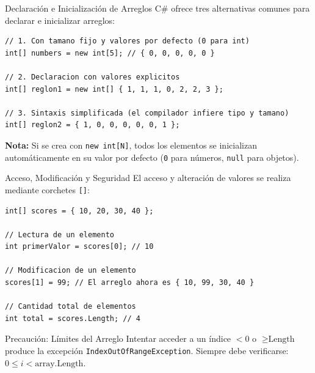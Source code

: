 \documentclass{beamer}
\begin{document}
\begin{frame}[fragile]{Declaraci\'on e Inicializaci\'on de Arreglos}
\lstset{style=CSharpStyle}
C\# ofrece tres alternativas comunes para declarar e inicializar arreglos:

\begin{lstlisting}
// 1. Con tamano fijo y valores por defecto (0 para int)
int[] numbers = new int[5]; // { 0, 0, 0, 0, 0 }

// 2. Declaracion con valores explicitos
int[] reglon1 = new int[] { 1, 1, 1, 0, 2, 2, 3 };

// 3. Sintaxis simplificada (el compilador infiere tipo y tamano)
int[] reglon2 = { 1, 0, 0, 0, 0, 0, 1 };
\end{lstlisting}

\vspace{0.2cm}
\textbf{Nota:} Si se crea con \texttt{new int[N]}, todos los elementos se inicializan autom\'aticamente en su valor por defecto (\texttt{0} para n\'umeros, \texttt{null} para objetos).
\end{frame}

\begin{frame}[fragile]{Acceso, Modificaci\'on y Seguridad}
\lstset{style=CSharpStyle}
El acceso y alteraci\'on de valores se realiza mediante corchetes \texttt{[]}:

\begin{lstlisting}
int[] scores = { 10, 20, 30, 40 };

// Lectura de un elemento
int primerValor = scores[0]; // 10

// Modificacion de un elemento
scores[1] = 99; // El arreglo ahora es { 10, 99, 30, 40 }

// Cantidad total de elementos
int total = scores.Length; // 4
\end{lstlisting}

\vspace{0.2cm}
\begin{alertblock}{Precauci\'on: L\'imites del Arreglo}
Intentar acceder a un \'indice $< 0$ o $\ge \text{Length}$ produce la excepci\'on \texttt{IndexOutOfRangeException}. Siempre debe verificarse: $0 \le i < \text{array.Length}$.
\end{alertblock}
\end{frame}
\end{document}

